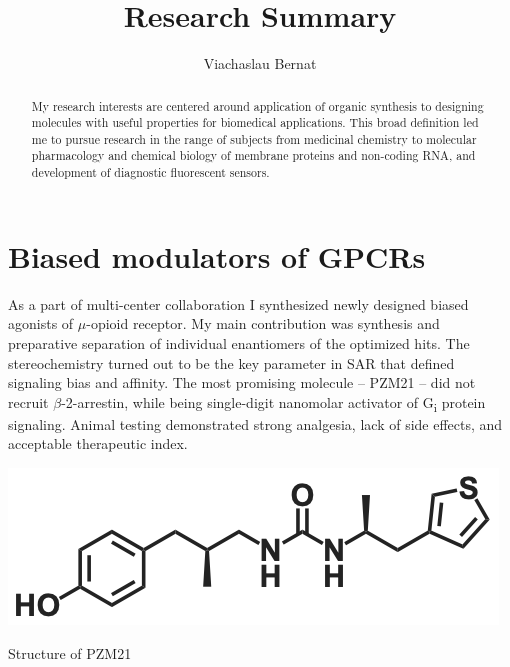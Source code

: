 \documentclass{tufte-handout}
\title{Research Summary}
\author[Viachaslau Bernat]{Viachaslau Bernat}
\begin{document}
\maketitle%

\begin{abstract}
\begin{fullwidth}
\noindent
My research interests are centered around application of organic synthesis to designing molecules with useful properties for biomedical applications. This broad definition led me to pursue research in the range of subjects from medicinal chemistry to molecular pharmacology and chemical biology of membrane proteins and non-coding RNA, and development of diagnostic fluorescent sensors. 
\end{fullwidth}
\end{abstract}

\section{Biased modulators of GPCRs}\label{sec:bias-gpcr}
\vspace{-0.5cm}

 As a part of multi-center 
collaboration I synthesized newly designed biased agonists of $\mu$-opioid receptor. My main contribution 
was synthesis and preparative separation of individual enantiomers of the optimized hits. The stereochemistry 
turned out to be the key parameter in SAR that defined signaling bias and affinity. The most 
promising molecule -- PZM21 -- did not recruit $\beta$-2-arrestin, while being single-digit nanomolar
activator of G\textsubscript{i} protein signaling. Animal testing demonstrated strong analgesia, lack of side effects, and acceptable 
therapeutic index\cite[-1.5cm]{Manglik2016}.
\begin{marginfigure}[-7.5cm]
	\includegraphics{PZM21.png}
	\caption{Structure of PZM21}
\end{marginfigure}
\end{document}
